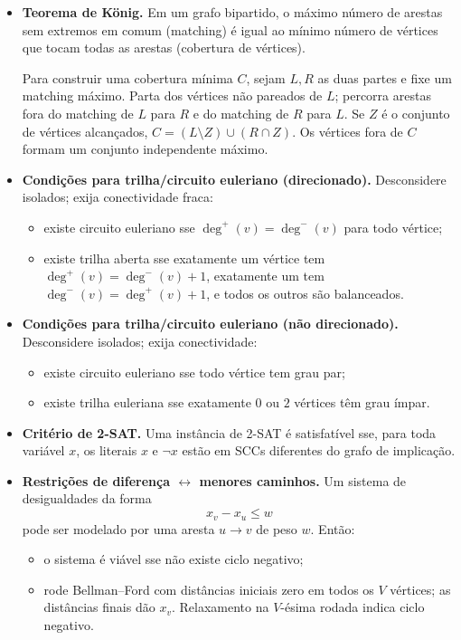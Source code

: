 \begin{itemize}[leftmargin=*,label={}]
\item \textbf{Teorema de König.}
		Em um grafo bipartido, o máximo número de arestas sem extremos em comum (matching) é igual ao mínimo número de vértices que tocam todas as arestas (cobertura de vértices).

		Para construir uma cobertura mínima $C$, sejam $L,R$ as duas partes e fixe um matching máximo. Parta dos vértices não pareados de $L$; percorra arestas fora do matching de $L$ para $R$ e do matching de $R$ para $L$. Se $Z$ é o conjunto de vértices alcançados, $C=(L\setminus Z)\cup(R\cap Z)$. Os vértices fora de $C$ formam um conjunto independente máximo.

	\item \textbf{Condições para trilha/circuito euleriano (direcionado).}
		Desconsidere isolados; exija conectividade fraca:
		\begin{itemize}
			\item existe circuito euleriano sse $\deg^+(v)=\deg^-(v)$ para todo vértice;
			\item existe trilha aberta sse exatamente um vértice tem $\deg^+(v)=\deg^-(v)+1$, exatamente um tem $\deg^-(v)=\deg^+(v)+1$, e todos os outros são balanceados.
		\end{itemize}

	\item \textbf{Condições para trilha/circuito euleriano (não direcionado).}
		Desconsidere isolados; exija conectividade:
		\begin{itemize}
			\item existe circuito euleriano sse todo vértice tem grau par;
			\item existe trilha euleriana sse exatamente $0$ ou $2$ vértices têm grau ímpar.
		\end{itemize}

\ifextended
	\item \textbf{Critério de 2-SAT.}
		Uma instância de 2-SAT é satisfatível sse, para toda variável $x$, os literais $x$ e $\neg x$ estão em SCCs diferentes do grafo de implicação.

\fi
	\item \textbf{Restrições de diferença $\leftrightarrow$ menores caminhos.}
		Um sistema de desigualdades da forma
		\[
			x_v - x_u \le w
		\]
		pode ser modelado por uma aresta $u \to v$ de peso $w$. Então:
		\begin{itemize}
			\item o sistema é viável sse não existe ciclo negativo;
			\item rode Bellman--Ford com distâncias iniciais zero em todos os $V$ vértices; as distâncias finais dão $x_v$. Relaxamento na $V$-ésima rodada indica ciclo negativo.
		\end{itemize}


\end{itemize}
